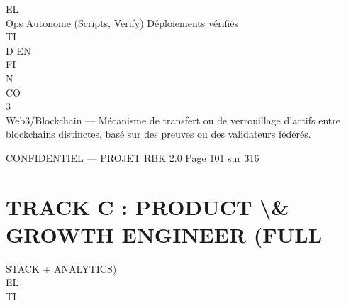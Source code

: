 \vspace{0.5em}
\vspace{0.5em}
\vspace{0.5em}
\vspace{0.5em}
EL\\
Ops      Autonome (Scripts, Verify) Déploiements vérifiés\\
\vspace{0.5em}
\vspace{0.5em}
\vspace{0.5em}
\vspace{0.5em}
TI\\
D     EN\\
FI\\
N\\
CO\\
\vspace{0.5em}
\vspace{0.5em}
\vspace{0.5em}
\vspace{0.5em}
3\\
Web3/Blockchain — Mécanisme de transfert ou de verrouillage d’actifs entre blockchains distinctes, basé sur des preuves ou des validateurs fédérés.\\
\vspace{0.5em}
\vspace{0.5em}
\begin{confidential}CONFIDENTIEL — PROJET RBK 2.0                                            Page 101 sur 316\end{confidential}
\section{TRACK C : PRODUCT \textbackslash{}& GROWTH ENGINEER (FULL}
STACK + ANALYTICS)\\
\vspace{0.5em}
\vspace{0.5em}
\vspace{0.5em}
\vspace{0.5em}
EL\\
TI\\
